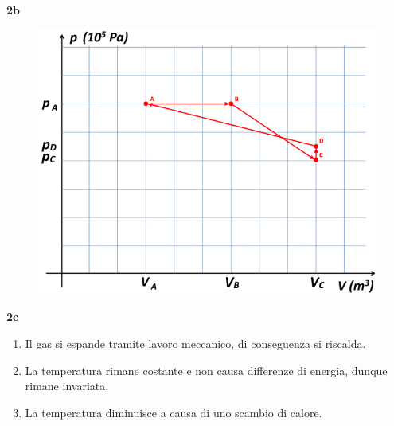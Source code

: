 \documentclass{article}
\begin{document}
\pagebreak
\textbf{2b} \\
\begin{figure}[h]
    \centering
    \includegraphics[width=.8\textwidth]{Esercizio 2 risolto.png}
    \vspace{0.4cm}
\end{figure}

\textbf{2c} \\

\begin{enumerate}[label=\textbf{.\roman*)}]
    \item Il gas si espande tramite lavoro meccanico, di conseguenza si riscalda.
    \item La temperatura rimane costante e non causa differenze di energia,
        dunque rimane invariata.
    \item La temperatura diminuisce a causa di uno scambio di calore.
\end{enumerate}
\end{document}
